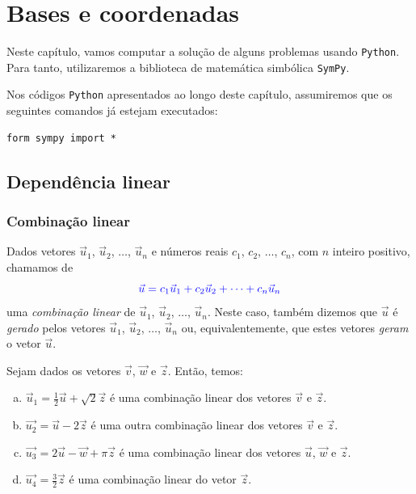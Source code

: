 
\chapter{Bases e coordenadas}\label{cap_base}
\thispagestyle{fancy}

\begin{obs}\label{obs:cap_base_python}
  Neste capítulo, vamos computar a solução de alguns problemas usando \verb+Python+. Para tanto, utilizaremos a biblioteca de matemática simbólica \verb+SymPy+.

  Nos códigos \verb+Python+ apresentados ao longo deste capítulo, assumiremos que os seguintes comandos já estejam executados:
\begin{verbatim}
form sympy import *
\end{verbatim}
\end{obs}

\section{Dependência linear}\label{cap_base_sec_deplinear}

\subsection{Combinação linear}

Dados vetores $\vec{u}_1$, $\vec{u}_2$, $\dotsc$, $\vec{u}_n$ e números reais $c_1$, $c_2$, $\dotsc$, $c_n$, com $n$ inteiro positivo, chamamos de
\begin{equation}
  {\color{blue}\vec{u} = c_1\vec{u}_1 + c_2\vec{u}_2 + \cdots + c_n\vec{u}_n}
\end{equation}
uma \emph{combinação linear} de $\vec{u}_1$, $\vec{u}_2$, $\dotsc$, $\vec{u}_n$. Neste caso, também dizemos que $\vec{u}$ é \emph{gerado} pelos vetores $\vec{u}_1$, $\vec{u}_2$, $\dotsc$, $\vec{u}_n$ ou, equivalentemente, que estes vetores \emph{geram} o vetor $\vec{u}$.

\begin{ex}\label{ex:comblinear}
  Sejam dados os vetores $\vec{v}$, $\vec{w}$ e $\vec{z}$. Então, temos:
  \begin{enumerate}[a)]
  \item $\vec{u}_1 = \frac{1}{2}\vec{u} + \sqrt{2}\vec{z}$ é uma combinação linear dos vetores $\vec{v}$ e $\vec{z}$.
  \item $\vec{u_2} = \vec{u} - 2\vec{z}$ é uma outra combinação linear dos vetores $\vec{v}$ e $\vec{z}$.
  \item $\vec{u_3} = 2\vec{u} - \vec{w} + \pi\vec{z}$ é uma combinação linear dos vetores $\vec{u}$, $\vec{w}$ e $\vec{z}$.
  \item $\vec{u_4} = \frac{3}{2}\vec{z}$ é uma combinação linear do vetor $\vec{z}$.
  \end{enumerate}
\end{ex}

